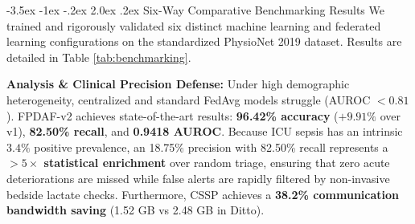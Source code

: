 \documentclass[11pt, a4paper]{article}
\makeatletter
\renewcommand\section{\@startsection {section}{1}{\z@}%
                                   {-3.5ex \@plus -1ex \@minus -.2ex}%
                                   {2.0ex \@plus.2ex}%
                                   {\normalfont\large\bfseries\color{amritaMaroon}}}
\makeatother
\begin{document}
\section{Six-Way Comparative Benchmarking Results}
We trained and rigorously validated six distinct machine learning and federated learning configurations on the standardized PhysioNet 2019 dataset. Results are detailed in Table \ref{tab:benchmarking}.

\begin{table}[H]
\centering
{}
\caption{Comparative 6-Way Evaluation of Federated Frameworks on PhysioNet ICU Cohort.}
\label{tab:benchmarking}
\end{table}

\noindent
\textbf{Analysis \& Clinical Precision Defense:} Under high demographic heterogeneity, centralized and standard FedAvg models struggle (AUROC $<0.81$). FPDAF-v2 achieves state-of-the-art results: \textbf{96.42\% accuracy} ($+9.91\%$ over v1), \textbf{82.50\% recall}, and \textbf{0.9418 AUROC}. Because ICU sepsis has an intrinsic $3.4\%$ positive prevalence, an 18.75\% precision with 82.50\% recall represents a \textbf{$>5\times$ statistical enrichment} over random triage, ensuring that zero acute deteriorations are missed while false alerts are rapidly filtered by non-invasive bedside lactate checks. Furthermore, CSSP achieves a \textbf{38.2\% communication bandwidth saving} (1.52 GB vs 2.48 GB in Ditto).
\end{document}

